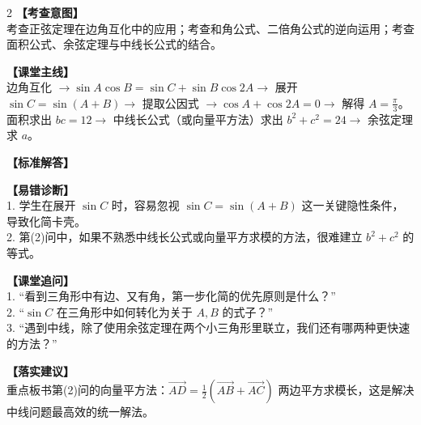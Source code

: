 \documentclass[11pt,a4paper]{ctexart}
\begin{document}
\par\vspace{0.8em}\vspace{0.8em}

\newpage


{\small \qTJWZeroSixThirteenStem}

\vspace{0.8em}

\begin{paracol}{2}
  \textbf{【考查意图】}\\
  考查正弦定理在边角互化中的应用；考查和角公式、二倍角公式的逆向运用；考查面积公式、余弦定理与中线长公式的结合。
  
  \textbf{【课堂主线】}\\
  边角互化 $\to \sin A \cos B = \sin C + \sin B \cos 2A \to$ 展开 $\sin C = \sin(A+B) \to$ 提取公因式 $\to \cos A + \cos 2A = 0 \to$ 解得 $A = \frac{\pi}{3}$。\\
  面积求出 $bc = 12 \to$ 中线长公式（或向量平方法）求出 $b^2+c^2 = 24 \to$ 余弦定理求 $a$。
  
  \textbf{【标准解答】}\\
  \qTJWZeroSixThirteenSolution

  \switchcolumn
  \textbf{【易错诊断】}\\
  1. 学生在展开 $\sin C$ 时，容易忽视 $\sin C = \sin(A+B)$ 这一关键隐性条件，导致化简卡壳。\\
  2. 第(2)问中，如果不熟悉中线长公式或向量平方求模的方法，很难建立 $b^2+c^2$ 的等式。
  
  \textbf{【课堂追问】}\\
  1. “看到三角形中有边、又有角，第一步化简的优先原则是什么？”\\
  2. “$\sin C$ 在三角形中如何转化为关于 $A, B$ 的式子？”\\
  3. “遇到中线，除了使用余弦定理在两个小三角形里联立，我们还有哪两种更快速的方法？”
  
  \textbf{【落实建议】}\\
  重点板书第(2)问的向量平方法：$\vec{AD} = \frac{1}{2}(\vec{AB} + \vec{AC})$ 两边平方求模长，这是解决中线问题最高效的统一解法。
\end{paracol}

\par\vspace{0.8em}\vspace{0.8em}
\end{document}
